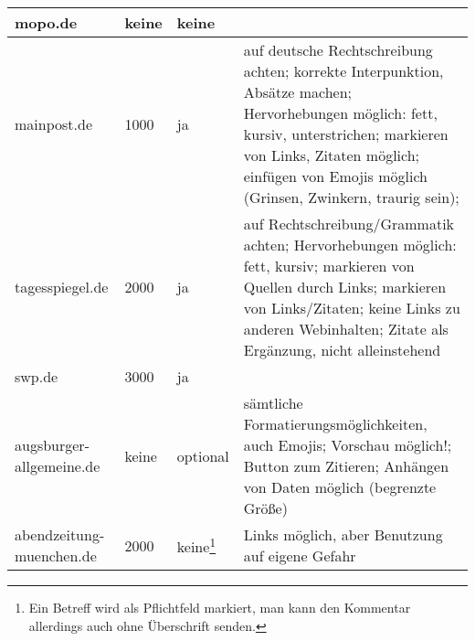 \begin{landscape}
\begin{longtable}{l|llp{100mm}}
mopo.de			& keine & keine & \\\hline
mainpost.de		& 1000 & ja & auf deutsche Rechtschreibung achten; korrekte Interpunktion, Absätze machen; Hervorhebungen möglich: fett, kursiv, unterstrichen; markieren von Links, Zitaten möglich; einfügen von Emojis möglich (Grinsen, Zwinkern, traurig sein); \\\hline
tagesspiegel.de		& 2000  & ja & auf Rechtschreibung/Grammatik achten; Hervorhebungen möglich: fett, kursiv; markieren von Quellen durch Links; markieren von Links/Zitaten; keine Links zu anderen Webinhalten; Zitate als Ergänzung, nicht alleinstehend \\\hline
swp.de			& 3000  & ja & \\ \hline
augsburger-allgemeine.de	& keine & optional & sämtliche Formatierungsmöglichkeiten, auch Emojis; Vorschau möglich!; Button zum Zitieren; Anhängen von Daten möglich (begrenzte Größe)\\ \hline
abendzeitung-muenchen.de	& 2000  & keine\footnote{Ein Betreff wird als Pflichtfeld markiert, man kann den Kommentar allerdings auch ohne Überschrift senden.}   & Links möglich, aber Benutzung auf eigene Gefahr\\ \hline

\end{longtable}
\end{landscape}



